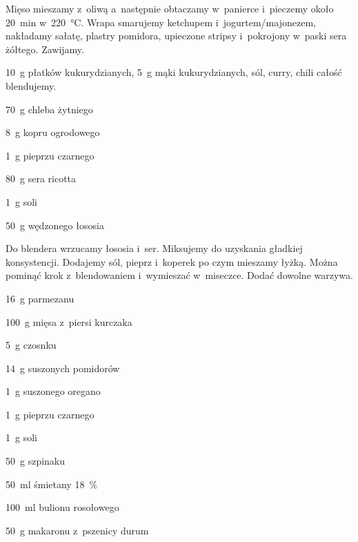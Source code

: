 \documentclass[../main.tex]{subfiles}
\begin{document}
Mięso mieszamy z~oliwą a~następnie obtaczamy w~panierce i~pieczemy około
\qty{20}{\minute} w~\qty{220}{\celsius}. Wrapa smarujemy ketchupem
i~jogurtem/majonezem, nakładamy sałatę, plastry pomidora, upieczone stripsy
i~pokrojony w~paski sera żółtego. Zawijamy.

 \qty{10}{\gram} płatków kukurydzianych, \qty{5}{\gram} mąki
kukurydzianych, sól, curry, chili całość blendujemy.


\begin{Ingred}
    \item \qty{70}{\gram} chleba żytniego
    \item \qty{8}{\gram} kopru ogrodowego
    \item \qty{1}{\gram} pieprzu czarnego
    \item \qty{80}{\gram} sera ricotta
    \item \qty{1}{\gram} soli
    \item \qty{50}{\gram} wędzonego łososia
\end{Ingred}

Do blendera wrzucamy łososia i~ser. Miksujemy do uzyskania gładkiej
konsystencji. Dodajemy sól, pieprz i~koperek po czym mieszamy łyżką. Można
pominąć krok z~blendowaniem i~wymieszać w~miseczce. Dodać dowolne warzywa.


\begin{Ingred}
    \item \qty{16}{\gram} parmezanu
    \item \qty{100}{\gram} mięsa z~piersi kurczaka
    \item \qty{5}{\gram} czosnku
    \item \qty{14}{\gram} suszonych pomidorów
    \item \qty{1}{\gram} suszonego oregano
    \item \qty{1}{\gram} pieprzu czarnego
    \item \qty{1}{\gram} soli
    \item \qty{50}{\gram} szpinaku
    \item \qty{50}{\milli\litre} śmietany \qty{18}{\percent}
    \item \qty{100}{\milli\litre} bulionu rosołowego
    \item \qty{50}{\gram} makaronu z~pszenicy durum
\end{Ingred}
\end{document}
